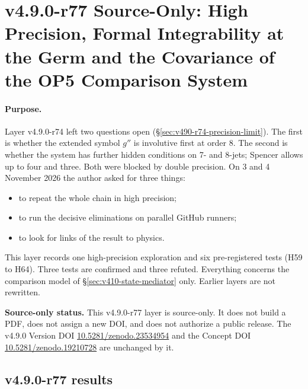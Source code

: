 \clearpage
\section*{v4.9.0-r77 Source-Only: High Precision, Formal Integrability at the Germ and the Covariance of the OP5 Comparison System}
\label{sec:v490-r77-high-precision-covariance}

\paragraph{Purpose.}
Layer v4.9.0-r74 left two questions open (\S\ref{sec:v490-r74-precision-limit}).  The first is whether the extended symbol
\(g''\) is involutive first at order 8.  The second is whether the system has further hidden conditions on 7- and 8-jets;
Spencer allows up to four and three.  Both were blocked by double precision.  On 3 and 4 November 2026 the author asked
for three things:
\begin{itemize}[leftmargin=2em]
\item to repeat the whole chain in high precision;
\item to run the decisive eliminations on parallel GitHub runners;
\item to look for links of the result to physics.
\end{itemize}
This layer records one high-precision exploration and six pre-registered tests (H59 to H64).  Three tests are confirmed
and three refuted.  Everything concerns the comparison model of \S\ref{sec:v410-state-mediator} only.  Earlier layers are
not rewritten.

\noindent\textbf{Source-only status.}
This v4.9.0-r77 layer is source-only.  It does not build a PDF, does not assign a new DOI,
and does not authorize a public release.  The v4.9.0 Version DOI
\href{https://doi.org/10.5281/zenodo.23534954}{10.5281/zenodo.23534954} and the Concept DOI
\href{https://doi.org/10.5281/zenodo.19210728}{10.5281/zenodo.19210728} are unchanged by it.

\subsection*{v4.9.0-r77 results}
\label{subsec:v490-r77-results}

